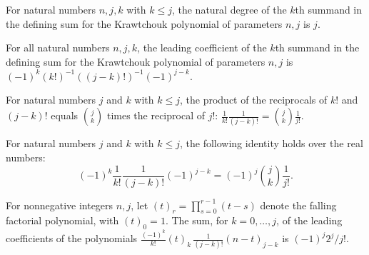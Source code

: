 \begin{theorem}
\label{FABL.krawtchoukSummand_natDegree}
\leanok
{}
For natural numbers $n,j,k$ with $k\le j$, the natural degree of the $k$th summand in
the defining sum for the Krawtchouk polynomial of parameters $n,j$ is $j$.
\end{theorem}

\begin{theorem}
\label{FABL.krawtchoukSummand_leadingCoeff}
\leanok
{}
For all natural numbers $n,j,k$, the leading coefficient of the $k$th summand in the
defining sum for the Krawtchouk polynomial of parameters $n,j$ is
$(-1)^k(k!)^{-1}((j-k)!)^{-1}(-1)^{j-k}$.
\end{theorem}

\begin{theorem}
\label{FABL.factorial_inverse_identity}
\leanok
{}
For natural numbers $j$ and $k$ with $k \le j$, the product of the reciprocals of $k!$
and $(j-k)!$ equals $\binom{j}{k}$ times the reciprocal of $j!$:
$\frac{1}{k!}\frac{1}{(j-k)!}=\binom{j}{k}\frac{1}{j!}$.
\end{theorem}

\begin{theorem}
\label{FABL.signed_factorial_inverse_identity}
\leanok
{}
For natural numbers $j$ and $k$ with $k\le j$, the following identity holds over the
real numbers:
$$(-1)^k\frac{1}{k!}\frac{1}{(j-k)!}(-1)^{j-k}=(-1)^j\binom{j}{k}\frac{1}{j!}.$$
\end{theorem}

\begin{theorem}
\label{FABL.sum_krawtchoukSummand_leadingCoeff}
\leanok
{}
For nonnegative integers $n,j$, let $(t)_r=\prod_{s=0}^{r-1}(t-s)$ denote the falling
factorial polynomial, with $(t)_0=1$. The sum, for $k=0,\ldots,j$, of the leading
coefficients of the polynomials $\frac{(-1)^k}{k!}(t)_k\,\frac{1}{(j-k)!}(n-t)_{j-k}$
is $(-1)^j2^j/j!$.
\end{theorem}

